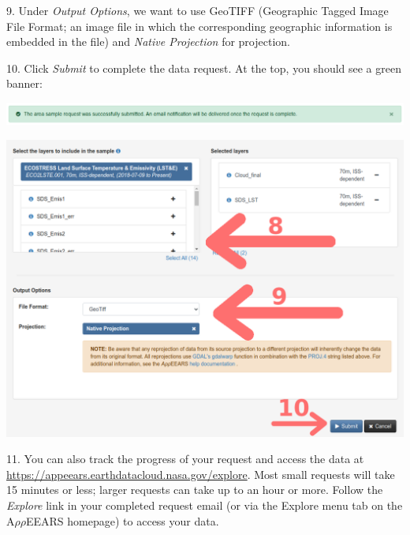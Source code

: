 \documentclass[oneside,a4paper,11pt,explicit]{book}
\begin{document}

9. Under \textit{Output Options}, we want to use GeoTIFF (Geographic Tagged Image File Format; an image file in which the corresponding geographic information is embedded in the file) and \textit{Native Projection} for projection.

10. Click \textit{Submit} to complete the data request. At the top, you should see a green banner:

\centerline{\includegraphics[width=\textwidth]{RequestSuccess.png}}

\centerline{\includegraphics[width=\textwidth]{LayerSettings.png}}

11. You can also track the progress of your request and access the data at \url{https://appeears.earthdatacloud.nasa.gov/explore}. Most small requests will take 15 minutes or less; larger requests can take up to an hour or more. Follow the \textit{Explore} link in your completed request email (or via the Explore menu tab on the A$\rho\rho$EEARS homepage) to access your data.

\end{document}
